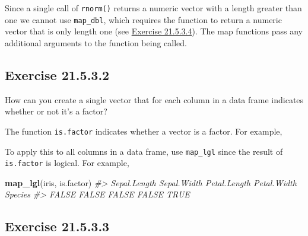 \documentclass[]{book}
\newenvironment{Shaded}{\begin{snugshade}}{\end{snugshade}}
\newcommand{\CommentTok}[1]{\textcolor[rgb]{0.56,0.35,0.01}{\textit{#1}}}
\newcommand{\KeywordTok}[1]{\textcolor[rgb]{0.13,0.29,0.53}{\textbf{#1}}}
\newcommand{\NormalTok}[1]{#1}
\newcommand{\OperatorTok}[1]{\textcolor[rgb]{0.81,0.36,0.00}{\textbf{#1}}}
\theoremstyle{plain}
\theoremstyle{remark}
\begin{document}
\begin{enumerate}
  Since a single call of \texttt{rnorm()} returns a numeric vector with
  a length greater than one we cannot use \texttt{map\_dbl}, which
  requires the function to return a numeric vector that is only length
  one (see \protect\hyperlink{exercise-21.5.3.4}{Exercise 21.5.3.4}).
  The map functions pass any additional arguments to the function being
  called.
\end{enumerate}

\hypertarget{exercise-21.5.3.2}{%
\subsection*{\texorpdfstring{Exercise
{21.5.3.2}}{Exercise 21.5.3.2}}\label{exercise-21.5.3.2}}

How can you create a single vector that for each column in a data frame
indicates whether or not it's a factor?

The function \texttt{is.factor} indicates whether a vector is a factor.
For example,

\begin{Shaded}
\end{Shaded}

To apply this to all columns in a data frame, use \texttt{map\_lgl}
since the result of \texttt{is.factor} is logical. For example,

\begin{Shaded}
\begin{Highlighting}[]
\KeywordTok{map_lgl}\NormalTok{(iris, is.factor)}
\CommentTok{#> Sepal.Length  Sepal.Width Petal.Length  Petal.Width      Species }
\CommentTok{#>        FALSE        FALSE        FALSE        FALSE         TRUE}
\end{Highlighting}
\end{Shaded}

\hypertarget{exercise-21.5.3.3}{%
\subsection*{\texorpdfstring{Exercise
{21.5.3.3}}{Exercise 21.5.3.3}}\label{exercise-21.5.3.3}}
\end{document}
